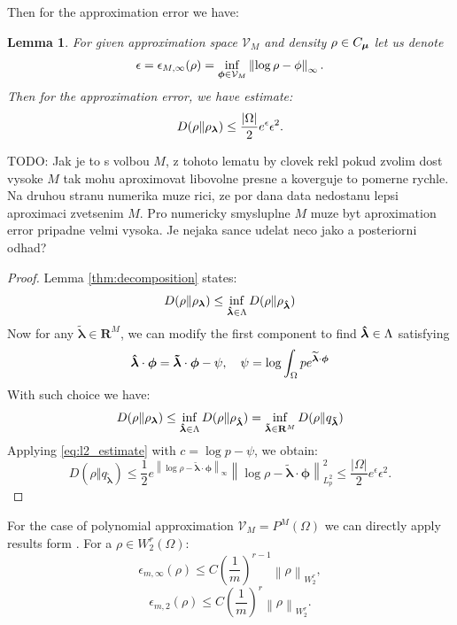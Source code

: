 \documentclass{article}
\newtheorem{lemma}[theorem]{Lemma}
\def\vc#1{\mathbf{\boldsymbol{#1}}}     %
\newcommand{\norm}[1]{\left\lVert#1\right\rVert}
\def\todo#1{{\color{red}TODO: #1}}
\def\R{\mathbf{R}}
\def\abs#1{|#1|}
\begin{document}
Then for the approximation error we have:
\begin{lemma}
\label{thm:approx_error}
For given approximation space $\mathcal V_M$ and density $\rho\in C_{\vmu}$ let us denote
\[
  \epsilon = \epsilon_{M,\infty}(\rho) = \inf_{\vphi \in \mathcal V_M} \norm{\log \rho - \phi}_\infty.
\]
Then for the approximation error, we have estimate:
\[
D(\rho\Vert\rho_{\vl})  \le \frac{\abs{\Omega}}{2} e^{\epsilon} \epsilon^2.
\]
\end{lemma}
\todo{Jak je to s volbou $M$, z tohoto lematu by clovek rekl pokud zvolim dost vysoke $M$ tak mohu aproximovat libovolne presne a koverguje to pomerne rychle. Na druhou stranu numerika muze rici, ze por dana data nedostanu lepsi aproximaci zvetsenim $M$. Pro numericky smysluplne $M$ muze byt aproximation error pripadne velmi vysoka. Je nejaka sance udelat neco jako a posteriorni odhad?} 
\begin{proof}
Lemma \ref{thm:decomposition} states:
\[
D(\rho\Vert\rho_{\vl}) \le \inf_{\estvl \in \Lambda} D(\rho\Vert\rho_{\estvl})
\]
Now for any $\vc{\tilde\lambda} \in \R^M$, we can modify the first component to find $\estvl \in \Lambda$ satisfying
\[
  \estvl \cdot \vphi = \vc{\tilde\lambda} \cdot \vphi - \psi, \quad \psi 
                             = \log \int_\Omega p e^{\widetilde{\vc\lambda}\cdot \vc \phi}
\]
With such choice we have:
\[
D(\rho\Vert\rho_{\vl}) \le \inf_{\estvl \in \Lambda} D(\rho\Vert\rho_{\estvl})
=\inf_{\vc{\tilde\lambda} \in \R^M} D(\rho\Vert q_{\vc{\tilde\lambda}})
\]
Applying \eqref{eq:l2_estimate} with $c = \log p - \psi$, we obtain:
\[
  D(\rho\Vert q_{\vc{\tilde\lambda}}) \le 
  \frac{1}{2}
  e^{\norm{\log \rho - \vc{\tilde\lambda}\cdot \vc \phi}_\infty} 
    \norm{\log \rho - \vc{\tilde\lambda}\cdot \vc \phi}_{L^2_p}^2
  \le \frac{\abs{\Omega}}{2} e^{\epsilon} \epsilon^2.
\]
\end{proof}
For the case of polynomial approximation $\mathcal V_M = P^M(\Omega)$ we can directly apply results form \cite[Section 7]{Barron1991}. For a $\rho \in W^r_2(\Omega)$:
\[
    \epsilon_{m,\infty}(\rho) \le C \left(\frac{1}{m}\right)^{r-1} \norm{\rho}_{W^r_2},
\]
\[
    \epsilon_{m,2}(\rho) \le C \left(\frac{1}{m}\right)^{r}\norm{\rho}_{W^r_2}.
\]
\end{document}
